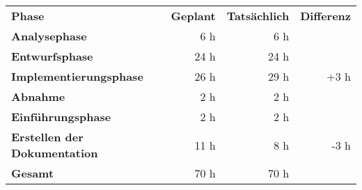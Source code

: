 \begin{tabular}{lrrr}
\rowcolor{heading}\textbf{Phase} & \textbf{Geplant} & \textbf{Tatsächlich} & \textbf{Differenz} \\
\textbf{Analysephase} & 6 h   & 6 h  &  \\
\rowcolor{odd}\textbf{Entwurfsphase} & 24 h  & 24 h  &  \\
\textbf{Implementierungsphase} & 26 h  & 29 h  & +3 h \\
\rowcolor{odd}\textbf{Abnahme} & 2 h   & 2 h   &  \\
\textbf{Einführungsphase} & 2 h   & 2 h   &  \\
\rowcolor{odd}\textbf{Erstellen der Dokumentation} & 11 h   & 8 h  & -3 h \\
\hline
\hline
\rowcolor{odd}\textbf{Gesamt} & 70 h  & 70 h  &  \\
\end{tabular}